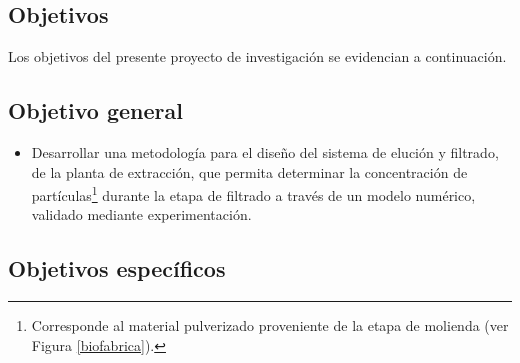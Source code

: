 \begin{center}
	\section{Objetivos}
\end{center}

\noindent
\justify

Los objetivos del presente proyecto de investigaci\'on se evidencian a continuaci\'on.

\subsection{Objetivo general}

\begin{itemize}
	\item Desarrollar una metodolog\'ia para el dise\~no del sistema de eluci\'on y filtrado, de la planta de extracci\'on, que permita determinar la concentraci\'on de part\'iculas\footnote{Corresponde al material pulverizado proveniente de la etapa de molienda (ver Figura \ref{biofabrica}).} durante la etapa de filtrado a trav\'es de un modelo num\'erico, validado mediante experimentaci\'on.
\end{itemize}

\subsection{Objetivos espec\'ificos}

